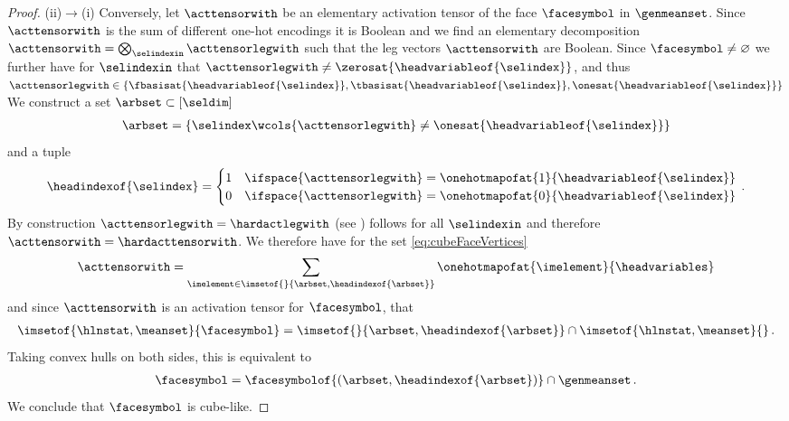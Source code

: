 \begin{proof}
    (ii)$\rightarrow$(i)
    Conversely, let $\acttensorwith$ be an elementary activation tensor of the face $\facesymbol$ in $\genmeanset$.
    Since $\acttensorwith$ is the sum of different one-hot encodings it is Boolean and we find an elementary decomposition $\acttensorwith=\bigotimes_{\selindexin}\acttensorlegwith$ such that the leg vectors $\acttensorwith$ are Boolean.
    Since $\facesymbol\neq\varnothing$ we further have for $\selindexin$ that $\acttensorlegwith\neq\zerosat{\headvariableof{\selindex}}$, and thus $\acttensorlegwith\in \{\fbasisat{\headvariableof{\selindex}},\tbasisat{\headvariableof{\selindex}},\onesat{\headvariableof{\selindex}}\}$
    We construct a set $\arbset\subset[\seldim]$
    \begin{align*}
        \arbset
        = \left\{\selindex \wcols {\acttensorlegwith}\neq\onesat{\headvariableof{\selindex}}\right\}
    \end{align*}
    and a tuple
    \begin{align*}
        \headindexof{\selindex}
        = \begin{cases}
              1 & \ifspace {\acttensorlegwith}=\onehotmapofat{1}{\headvariableof{\selindex}} \\
              0 & \ifspace {\acttensorlegwith}=\onehotmapofat{0}{\headvariableof{\selindex}}
        \end{cases} \, .
    \end{align*}
    By construction ${\acttensorlegwith} = \hardactlegwith$ (see ) follows for all $\selindexin$ and therefore $\acttensorwith=\hardacttensorwith$.
    We therefore have for the set \eqref{eq:cubeFaceVertices}
    \begin{align*}
        \acttensorwith
        = \sum_{\imelement\in\imsetof{}{\arbset,\headindexof{\arbset}}} \onehotmapofat{\imelement}{\headvariables}
    \end{align*}
    and since $\acttensorwith$ is an activation tensor for $\facesymbol$, that
    \begin{align*}
        \imsetof{\hlnstat,\meanset}{\facesymbol}
        = \imsetof{}{\arbset,\headindexof{\arbset}}\cap\imsetof{\hlnstat,\meanset}{} \, .
    \end{align*}
    Taking convex hulls on both sides, this is equivalent to
    \begin{align*}
        \facesymbol
        = \facesymbolof{(\arbset,\headindexof{\arbset})} \cap \genmeanset \, .
    \end{align*}
    We conclude that $\facesymbol$ is cube-like.
\end{proof}

